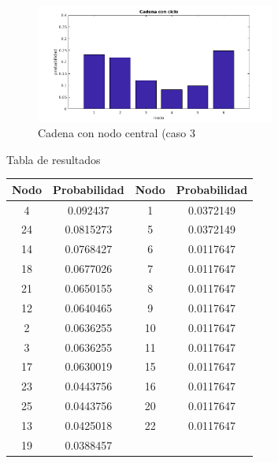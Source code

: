 \begin{figure}
  \centering
    \includegraphics[width=0.7\textwidth]{img/cadena6v3.png}
  \caption{Cadena con nodo central (caso 3}
  \label{fig: Cadena con nodo central, con ciclo}
\end{figure}

\par Tabla de resultados
\begin{table}
	\begin{tabular}{|c|c|c|c|}
		\hline
		Nodo & Probabilidad & Nodo & Probabilidad \\ \hline
		4    & 0.092437     & 1    & 0.0372149    \\
		24   & 0.0815273    & 5    & 0.0372149    \\
		14   & 0.0768427    & 6    & 0.0117647    \\
		18   & 0.0677026    & 7    & 0.0117647    \\
		21   & 0.0650155    & 8    & 0.0117647    \\
		12   & 0.0640465    & 9    & 0.0117647    \\
		2    & 0.0636255    & 10   & 0.0117647    \\
		3    & 0.0636255    & 11   & 0.0117647    \\
		17   & 0.0630019    & 15   & 0.0117647    \\
		23   & 0.0443756    & 16   & 0.0117647    \\
		25   & 0.0443756    & 20   & 0.0117647    \\
		13   & 0.0425018    & 22   & 0.0117647    \\
		19   & 0.0388457    & ~    & ~            \\ \hline
	\end{tabular}
\end{table}

